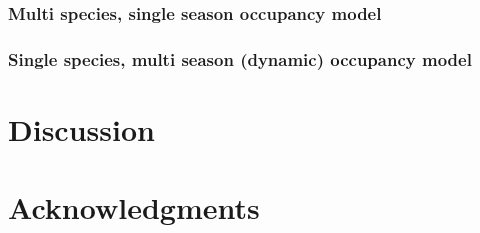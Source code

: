 \documentclass[12pt]{article}
\begin{document}
\subsubsection*{Multi species, single season occupancy model}
\label{sec:msss}

\subsubsection*{Single species, multi season (dynamic) occupancy
  model}

\section*{Discussion}
\label{sec:discussion}

\section*{Acknowledgments}
\label{sec:acknowledge}





\end{document}
